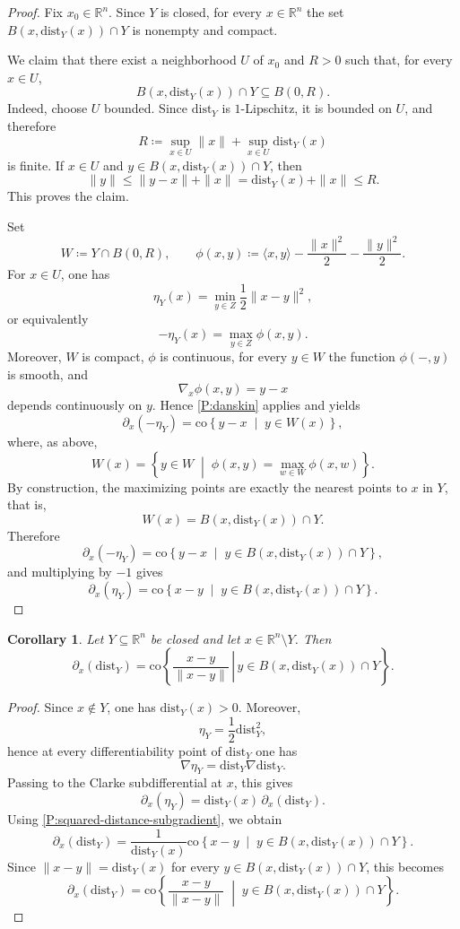 \documentclass{amsart}
\newcommand{\R}{\mathbb{R}}
\newcommand{\dd}{\mathrm{dist}}
\newtheorem{corollary}[subsubsection]{Corollary}
\theoremstyle{definition}
\theoremstyle{remark}
\begin{document}
\begin{proof}
Fix $x_0 \in \R^n$. Since $Y$ is closed, for every $x \in \R^n$ the set $B(x,\dd_Y(x)) \cap Y$ is nonempty and compact.

We claim that there exist a neighborhood $U$ of $x_0$ and $R>0$ such that, for every $x \in U$,
\[
B(x,\dd_Y(x)) \cap Y \subseteq B(0,R).
\]
Indeed, choose $U$ bounded. Since $\dd_Y$ is $1$-Lipschitz, it is bounded on $U$, and therefore
\[
R \coloneqq \sup_{x \in U}\|x\|+\sup_{x \in U}\dd_Y(x)
\]
is finite. If $x \in U$ and $y \in B(x,\dd_Y(x)) \cap Y$, then
\[
\|y\| \leq \|y-x\|+\|x\|=\dd_Y(x)+\|x\| \leq R.
\]
This proves the claim.

Set
\[
W \coloneqq Y \cap B(0,R),
\qquad
\phi(x,y)\coloneqq \langle x,y\rangle-\frac{\|x\|^2}{2}-\frac{\|y\|^2}{2}.
\]
For $x \in U$, one has
\[
\eta_Y(x)=\min_{y \in Z}\frac{1}{2}\|x-y\|^2,
\]
or equivalently
\[
-\eta_Y(x)=\max_{y \in Z}\phi(x,y).
\]
Moreover, $W$ is compact, $\phi$ is continuous, for every $y \in W$ the function $\phi(-,y)$ is smooth, and
\[
\nabla_x\phi(x,y)=y-x
\]
depends continuously on $y$. Hence \cref{P:danskin} applies and yields
\[
\partial_x(-\eta_Y)=\mathrm{co}\left\{ y-x \;\middle|\; y \in W(x)\right\},
\]
where, as above,
\[
W(x)=\left\{ y \in W \;\middle|\; \phi(x,y)=\max_{w \in W}\phi(x,w)\right\}.
\]
By construction, the maximizing points are exactly the nearest points to $x$ in $Y$, that is,
\[
W(x)=B(x,\dd_Y(x)) \cap Y.
\]
Therefore
\[
\partial_x(-\eta_Y)=\mathrm{co}\left\{ y-x \;\middle|\; y \in B(x,\dd_Y(x)) \cap Y \right\},
\]
and multiplying by $-1$ gives
\[
\partial_x(\eta_Y)= \mathrm{co}\left\{ x-y \;\middle|\; y \in B(x,\dd_Y(x)) \cap Y \right\}.
\]
\end{proof}

\begin{corollary}\label{propo:subgradient1}
Let $Y\subseteq \R^n$ be closed and let $x\in \R^n \setminus Y$. Then
\[
\partial_x(\dd_Y) = \mathrm{co}\left\{
\left.
\frac{x-y}{\|x-y\|}
\,\right|\,
y \in B(x,\dd_Y(x)) \cap Y
\right\}.
\]
\end{corollary}

\begin{proof}
Since $x \notin Y$, one has $\dd_Y(x)>0$. Moreover,
\[
\eta_Y=\frac{1}{2}\dd_Y^2,
\]
hence at every differentiability point of $\dd_Y$ one has
\[
\nabla \eta_Y=\dd_Y \nabla \dd_Y.
\]
Passing to the Clarke subdifferential at $x$, this gives
\[
\partial_x(\eta_Y)=\dd_Y(x)\,\partial_x(\dd_Y).
\]
Using \cref{P:squared-distance-subgradient}, we obtain
\[
\partial_x(\dd_Y)
=
\frac{1}{\dd_Y(x)}
\mathrm{co}\left\{ x-y \;\middle|\; y \in B(x,\dd_Y(x)) \cap Y \right\}.
\]
Since $\|x-y\|=\dd_Y(x)$ for every $y \in B(x,\dd_Y(x)) \cap Y$, this becomes
\[
\partial_x(\dd_Y) = \mathrm{co}\left\{
\frac{x-y}{\|x-y\|}
\;\middle|\;
y \in B(x,\dd_Y(x)) \cap Y
\right\}.
\]
\end{proof}
\end{document}
